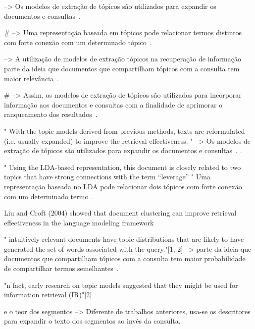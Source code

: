 --> Os modelos de extração de tópicos são utilizados para expandir os documentos e consultas~\cite{WEI2007}.

# --> Uma representação baseada em tópicos pode relacionar termos distintos com forte conexão com um determinado tópico~\cite{Wei2006}.

--> A utilização de modelos de extração tópicos na recuperação de informação parte da ideia que documentos que compartilham tópicos com a consulta tem maior relevância~\cite{Xing2009}. 

# --> Assim, os modelos de extração de tópicos são utilizados para incorporar informação aos documentos e consultas com a finalidade de aprimorar o ranqueamento dos resultados~\cite{WEI2007}.


" With the topic models derived from previous methods, texts are reformulated (i.e. usually expanded) to improve the retrieval effectiveness. "  
--> Os modelos de extração de tópicos são utilizados para expandir os documentos e consultas~\cite{WEI2007}.
.



" Using the LDA-based representation, this document is closely related to two topics that have strong connections with the term “leverage” "
Uma representação baseada no LDA pode relacionar dois tópicos com forte conexão com um determinado termo~\cite{Wei2006}.




Liu and Croft (2004) showed that document clustering can improve retrieval effectiveness in the language modeling framework


" intuitively relevant documents have topic distributions that are likely to have generated the set of words associated with the query."[1, 2]
--> { parte da ideia que documentos que compartilham tópicos com  a consulta tem maior probabilidade de compartilhar termos semelhantes~\cite{Xing2009}. } 

"n fact, early research on topic models suggested that they might be used for information retrieval (IR)"[2]





e o teor dos segmentos
--> { Diferente de trabalhos anteriores, usa-se os descritores para expandir o texto dos segmentos ao invés da consulta. }

